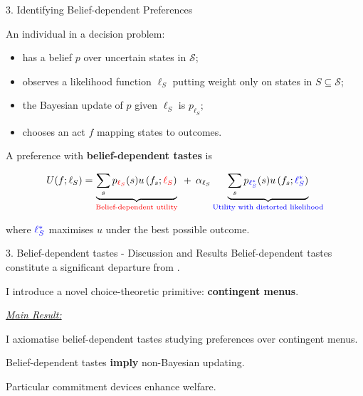 \documentclass[usenames,dvipsnames,aspectratio=169,11pt]{beamer}
\begin{document}
\begin{frame}[noframenumbering]{3. Identifying Belief-dependent Preferences}

	An individual in a decision problem:

	\vfill

	\begin{itemize}
		\item has a belief \( p \) over uncertain states in \( \mathcal{S} \);
		\item observes a likelihood function \( \ell_S \) putting weight only on states in \( S \subseteq \mathcal{S} \);
		\item the Bayesian update of \( p \) given \( \ell_S \) is \( p_{\ell_S} \);
		\item chooses an act \( f \) mapping states to outcomes.
	\end{itemize}

	\vfill

	A preference with \textbf{belief-dependent tastes} is
	\vfill

	\[
		U (f ; \ell_S)= \underbrace{\sum_s p_{\textcolor{red}{\ell_S}} (s) u\left(f_s ; \textcolor{red}{\ell_S} \right)}_{\text{\textcolor{red}{Belief-dependent utility}}} \: \: + \: \: \alpha_{\ell_S} \underbrace{\sum_s p_{\textcolor{blue}{\ell^{*}_{S}}} (s) u\left(f_s ; \textcolor{blue}{\ell^{*}_{S}} \right)}_{\text{\textcolor{blue}{Utility with distorted likelihood}}}
	\]

	\vfill

	where \( \textcolor{blue}{\ell^{*}_{S}} \) maximises \( u \) under the best possible outcome.

\end{frame}

\begin{frame}{3. Belief-dependent tastes - Discussion and Results}
	Belief-dependent tastes constitute a significant departure from \cite{savageFoundationsStatistics1972}. \pause

	\vfill

	I introduce a novel choice-theoretic primitive: \textbf{contingent menus}. \pause

	\vfill

	\underline{\textit{Main Result:}}

	I axiomatise belief-dependent tastes studying preferences over contingent menus. \pause

	\vfill

	Belief-dependent tastes \textbf{imply} non-Bayesian updating.

	\vfill

	Particular commitment devices enhance welfare.
\end{frame}
\end{document}
